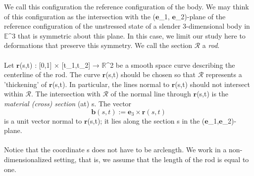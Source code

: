 \documentclass[12pt]{article}
\begin{document}
We call this configuration the reference configuration of the body.
We may think of this configuration as the intersection with the ($\mathbf{e}$_1, $\mathbf{e}$_2)-plane of the reference configuration of the unstressed state of a slender 3-dimensional body in $\mathbb{E}$^3 that is symmetric about this plane. In this case, we limit our study here to deformations that preserve this symmetry. We call the section $\mathcal{R}$ a \emph{rod}.
\\\\
Let $\mathbf{r}$(s,t) : [0,1] × [t_1,t_2] → $\mathbb{R}$^2 be a smooth space curve describing the centerline of the rod.  The curve $\mathbf{r}$(s,t) should be chosen so that $\mathcal{R}$ represents a 'thickening' of $\mathbf{r}$(s,t). In particular, the lines normal to $\mathbf{r}$(s,t) should not intersect within $\mathcal{R}$. The intersection with $\mathcal{R}$ of the normal line through $\mathbf{r}$(s,t) is the \emph{material (cross) section} (at) s.  The vector 
\[ \mathbf{b}(s,t) := \mathbf{e}_3\times\mathbf{r}(s,t) \]
is a unit vector normal to $\mathbf{r}$(s,t); it lies along the section s in the ($\mathbf{e}$_1,$\mathbf{e}$_2)-plane.
\\\\
Notice that the coordinate s does not have to be arclength.
We work in a non-dimensionalized setting, that is, we assume that the length of the rod is equal to one. 
\end{document}
